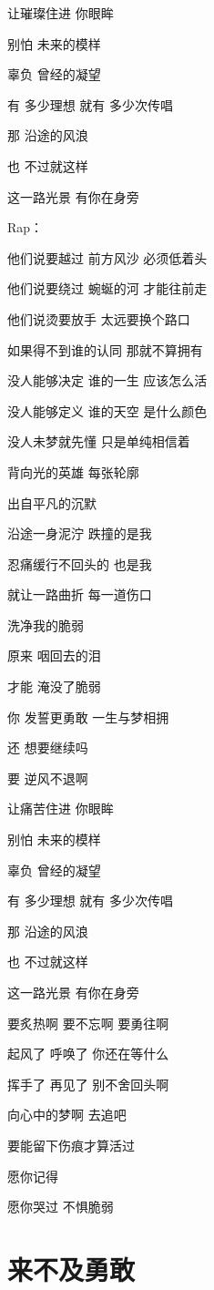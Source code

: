 \documentclass[]{ctexbook}
\begin{document}
让璀璨住进 你眼眸

别怕 未来的模样

辜负 曾经的凝望

有 多少理想 就有 多少次传唱

那 沿途的风浪

也 不过就这样

这一路光景 有你在身旁

Rap：

他们说要越过 前方风沙 必须低着头

他们说要绕过 蜿蜒的河 才能往前走

他们说烫要放手 太远要换个路口

如果得不到谁的认同 那就不算拥有

没人能够决定 谁的一生 应该怎么活

没人能够定义 谁的天空 是什么颜色

没人未梦就先懂 只是单纯相信着

背向光的英雄 每张轮廓

出自平凡的沉默

沿途一身泥泞 跌撞的是我

忍痛缓行不回头的 也是我

就让一路曲折 每一道伤口

洗净我的脆弱

原来 咽回去的泪

才能 淹没了脆弱

你 发誓更勇敢 一生与梦相拥

还 想要继续吗

要 逆风不退啊

让痛苦住进 你眼眸

别怕 未来的模样

辜负 曾经的凝望

有 多少理想 就有 多少次传唱

那 沿途的风浪

也 不过就这样

这一路光景 有你在身旁

要炙热啊 要不忘啊 要勇往啊

起风了 呼唤了 你还在等什么

挥手了 再见了 别不舍回头啊

向心中的梦啊 去追吧

要能留下伤痕才算活过

愿你记得

愿你哭过 不惧脆弱

\section*{来不及勇敢}\label{late-to-be-brave}
\end{document}
